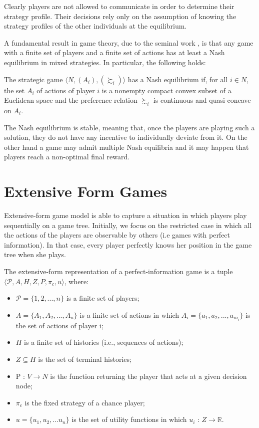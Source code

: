 Clearly players are not allowed to communicate in order to determine their strategy profile. Their decisions rely only on the assumption of knowing the strategy profiles of the other individuals at the equilibrium. 

A fundamental result in game theory, due to the seminal work \citep{Nash1951}, is that any game with a finite set of players and a finite set of actions has at least a Nash equilibrium in mixed strategies. In particular, the following holds:
\begin{theorem}
	The strategic game $\langle N,(A_{i}),(\succsim_{i})\rangle$ has a Nash equilibrium if, for all $i\in N$, the set $A_{i}$ of actions of player $i$ is a nonempty compact convex subset of a Euclidean space and the preference relation $\succsim_{i}$ is continuous and quasi-concave on $A_{i}$.
\end{theorem}
The Nash equilibrium is stable, meaning that, once the players are playing such a solution, they do not have any incentive to individually deviate from it. On the other hand a game may admit multiple Nash equilibria and it may happen that players reach a non-optimal final reward.

\section{Extensive Form Games}

Extensive-form game model is able to capture a situation in which players play sequentially on a game tree. Initially, we focus on the restricted case in which all the actions of the players are observable by others (i.e games with perfect information). In that case, every player perfectly knows her position in the game tree when she plays.


\begin{definition}
	The extensive-form representation of a perfect-information game is a tuple $\langle \mathcal{P},A,H,Z,P,\pi_c,u\rangle$, where: 
	\begin{itemize}
 \item $\mathcal{P}=\{1,2,...,n\}$ is a finite set of players; 
 \item $A=\{A_1,A_2,...,A_n\}$ is a finite set of actions in which $A_i=\{a_1,a_2,...,a_{m_i}\}$ is the set of actions of player i; 
 \item $H$ is a finite set of histories (i.e., sequences of actions);
 \item $Z\subseteq H$ is the set of terminal histories;
 \item P : $V\to N$ is the function returning the player that acts at a given decision node;
 \item $\pi_c$ is the fixed strategy of a chance player;
 \item $u=\{u_1,u_2,...u_n\}$ is the set of utility functions in which $u_i$ : $Z\to \mathbb{R}$.
   \end{itemize}
\end{definition}

